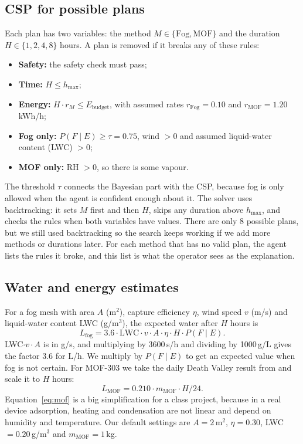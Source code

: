 \documentclass[11pt]{article}
\begin{document}
\newpage
\subsection{CSP for possible plans}
Each plan has two variables: the method $M\in\{\text{Fog},\text{MOF}\}$ and the duration $H\in\{1,2,4,8\}$ hours. A plan is removed if it breaks any of these rules:
\begin{itemize}\setlength\itemsep{0pt}
\item \textbf{Safety:} the safety check must pass;
\item \textbf{Time:} $H\le h_{\max}$;
\item \textbf{Energy:} $H\cdot r_M \le E_{\text{budget}}$, with assumed rates $r_{\text{Fog}}=0.10$ and $r_{\text{MOF}}=1.20$\,kWh/h;
\item \textbf{Fog only:} $P(F\mid E)\ge\tau=0.75$, wind $>0$ and assumed liquid-water content (LWC) $>0$;
\item \textbf{MOF only:} RH $>0$, so there is some vapour.
\end{itemize}
The threshold $\tau$ connects the Bayesian part with the CSP, because fog is only allowed when the agent is confident enough about it. The solver uses backtracking: it sets $M$ first and then $H$, skips any duration above $h_{\max}$, and checks the rules when both variables have values. There are only 8 possible plans, but we still used backtracking so the search keeps working if we add more methods or durations later. For each method that has no valid plan, the agent lists the rules it broke, and this list is what the operator sees as the explanation.

\subsection{Water and energy estimates}
For a fog mesh with area $A$ (m$^2$), capture efficiency $\eta$, wind speed $v$ (m/s) and liquid-water content LWC (g/m$^3$), the expected water after $H$ hours is
\begin{equation}
L_{\text{fog}} = 3.6\cdot \text{LWC}\cdot v \cdot A\cdot \eta \cdot H \cdot P(F\mid E). \label{eq:fog}
\end{equation}
LWC$\cdot v\cdot A$ is in g/s, and multiplying by 3600\,s/h and dividing by 1000\,g/L gives the factor 3.6 for L/h. We multiply by $P(F\mid E)$ to get an expected value when fog is not certain. For MOF-303 we take the daily Death Valley result from \citet{song2023mof} and scale it to $H$ hours:
\begin{equation}
L_{\text{MOF}} = 0.210\cdot m_{\text{MOF}}\cdot H/24. \label{eq:mof}
\end{equation}
Equation~\ref{eq:mof} is a big simplification for a class project, because in a real device adsorption, heating and condensation are not linear and depend on humidity and temperature. Our default settings are $A=2$\,m$^2$, $\eta=0.30$, LWC $=0.20$\,g/m$^3$ and $m_{\text{MOF}}=1$\,kg.
\end{document}
